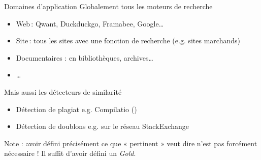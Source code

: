 \documentclass[hyperref={unicode}, xcolor={svgnames}, french]{beamer}
\begin{document}
\begin{frame}{Domaines d'application}
    Globalement tous les moteurs de recherche
    \begin{itemize}
        \item Web : Qwant, Duckduckgo, Framabee, Google…
        \item Site : tous les sites avec une fonction de recherche (e.g. sites marchands)
        \item Documentaires : en bibliothèques, archives…
        \item …
    \end{itemize}
    Mais aussi les détecteurs de similarité
    \begin{itemize}
        \item Détection de plagiat e.g. Compilatio ()
        \item Détection de doublons e.g. sur le réseau StackExchange
    \end{itemize}
    Note : avoir défini précisément ce que « pertinent » veut dire n'est pas forcément nécessaire ! Il suffit d'avoir défini un \textit{Gold}.
\end{frame}
\end{document}
